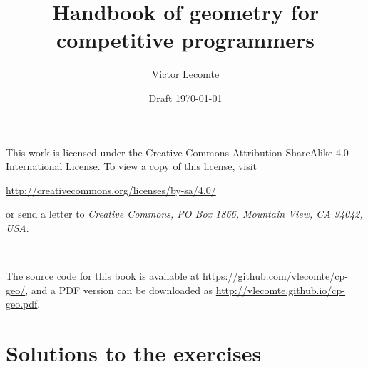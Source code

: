 \documentclass[a4paper,11pt]{report}
\title{Handbook of geometry for competitive programmers}
\author{Victor Lecomte}
\date{Draft \today}
\begin{document}
\maketitle
{}
\vspace*{\fill}
\noindent This work is licensed under the Creative Commons Attribution-ShareAlike 4.0 International License. To view a copy of this license, visit
\begin{center}
\url{http://creativecommons.org/licenses/by-sa/4.0/}
\end{center}
or send a letter to \emph{Creative Commons, PO Box 1866, Mountain View, CA 94042, USA}.

~

The source code for this book is available at \url{https://github.com/vlecomte/cp-geo/}, and a PDF version can be downloaded as \url{http://vlecomte.github.io/cp-geo.pdf}.
\vspace*{\fill}

\newpage

\tableofcontents




\appendix
\chapter{Solutions to the exercises}



\printbibliography
\end{document}
